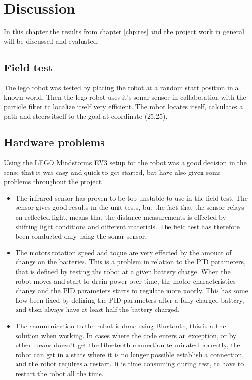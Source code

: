 \chapter{Discussion}
\label{chp:disc}
In this chapter the results from chapter \ref{chp:res} and the project work in general will be discussed and evaluated.

\section{Field test}
The lego robot was tested by placing the robot at a random start position in a known world. Then the lego robot uses it's sonar sensor in collaboration with the particle filter to localize itself very efficient. The robot locates itself, calculates a path and steers itself to the goal at coordinate (25,25). 

\section{Hardware problems}
Using the LEGO Mindstorms EV3 setup for the robot was a good decision in the sense that it was easy and quick to get started, but have also given some problems throughout the project.

\begin{itemize}
	\item The infrared sensor has proven to be too unstable to use in the field test.
	The sensor gives good results in the unit tests, but the fact that the sensor relays on reflected light, means that the distance measurements is effected by shifting light conditions and different materials.
	The field test has therefore been conducted only using the sonar sensor.
	\item The motors rotation speed and toque are very effected by the amount of change on the batteries.
	This is a problem in relation to the PID parameters, that is defined by testing the robot at a given battery charge.
	When the robot moves and start to drain power over time, the motor characteristics change and the PID parameters starts to regulate more poorly.
	This has some how been fixed by defining the PID parameters after a fully charged battery, and then always have at least half the battery charged.
	\item The communication to the robot is done using Bluetooth, this is a fine solution when working.
	In cases where the code enters an exception, or by other means doesn't get the Bluetooth connection terminated correctly, the robot can get in a state where it is no longer possible establish a connection, and the robot requires a restart.
	It is time consuming during test, to have to restart the robot all the time.
\end{itemize}

